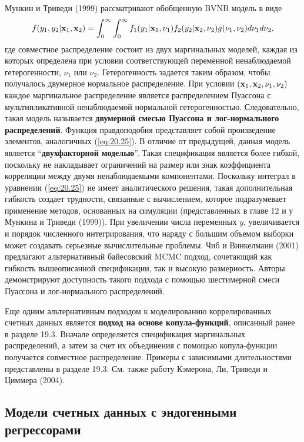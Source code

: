 Мункин и Триведи (1999) рассматривают обобщенную BVNB модель в виде
    \begin{align}\label{eq:20.25}
    f(y_1, y_2 | \mathbf{x}_1, \mathbf{x}_2) = \int^{\infty}_{0} \int^{\infty}_{0} f_1(y_1|\mathbf{x}_1, \nu_1) f_2(y_2|\mathbf{x}_2, \nu_2) g(\nu_1, \nu_2) d\nu_1 d\nu_2,
    \end{align}
где совместное распределение состоит из двух маргинальных моделей, каждая из которых определена при условии соответствующей переменной ненаблюдаемой гетерогенности, $\nu_1$ или $\nu_2$. Гетерогенность задается таким образом, чтобы получалось двумерное нормальное распределение. При условии $(\mathbf{x}_1, \mathbf{x}_2, \nu_1, \nu_2)$ каждое маргинальное распределение является распределением Пуассона с мультипликативной ненаблюдаемой нормальной гетерогенностью. Следовательно, такая модель называется \textbf{двумерной смесью Пуассона и лог-нормального распределений}. Функция правдоподобия представляет собой произведение элементов, аналогичных (\ref{eq:20.25}). В отличие от предыдущей, данная модель является ``\textbf{двухфакторной моделью}''. Такая спецификация является более гибкой, поскольку не накладывает ограничений на размер или знак коэффициента корреляции между двумя ненаблюдаемыми компонентами. Поскольку интеграл в уравнении (\ref{eq:20.25}) не имеет аналитического решения, такая дополнительная гибкость создает трудности, связанные с вычислением, которое подразумевает применение методов, основанных на симуляции (представленных в главе 12 и у Мункина и Триведи (1999)). %
При увеличении числа переменных $y$, увеличивается и порядок численного интегрирования, что наряду с большим объемом выборки может создавать серьезные вычислительные проблемы. Чиб и Винкелманн (2001) предлагают альтернативный байесовский MCMC подход, сочетающий как гибкость вышеописанной спецификации, так и высокую размерность. Авторы демонстрируют доступность такого подхода с помощью шестимерной смеси Пуассона и лог-нормального распределений.

Еще одним альтернативным подходом к моделированию коррелированных счетных данных является \textbf{подход на основе копула-функций}, описанный ранее в разделе 19.3. Вначале определяется спецификация маргинальных распределений, а затем за счет их объединения с помощью копула-функции получается совместное распределение. Примеры с зависимыми длительностями представлены в разделе 19.3. См. также работу Кэмерона, Ли, Триведи и Циммера (2004).


\subsection{Модели счетных данных с эндогенными регрессорами}\label{sec:20.6.2}

